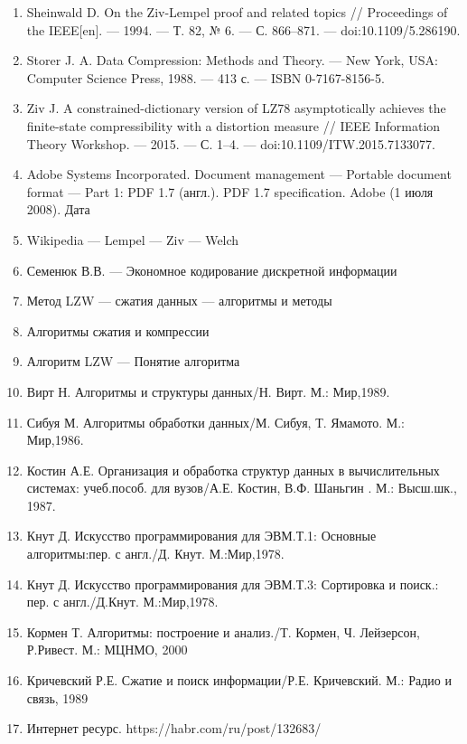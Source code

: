 \documentclass{article}
\begin{document}
\begin{enumerate}
\item Sheinwald D. On the Ziv-Lempel proof and related topics // Proceedings of the IEEE[en]. — 1994. — Т. 82, № 6. — С. 866–871. — doi:10.1109/5.286190.
\item Storer J. A. Data Compression: Methods and Theory. — New York, USA: Computer Science Press, 1988. — 413 с. — ISBN 0-7167-8156-5.
\item Ziv J. A constrained-dictionary version of LZ78 asymptotically achieves the finite-state compressibility with a distortion measure // IEEE Information Theory Workshop. — 2015. — С. 1–4. — doi:10.1109/ITW.2015.7133077.
\item Adobe Systems Incorporated. Document management — Portable document format — Part 1: PDF 1.7 (англ.). PDF 1.7 specification. Adobe (1 июля 2008). Дата
\item Wikipedia — Lempel — Ziv — Welch
\item Семенюк В.В. — Экономное кодирование дискретной информации
\item Метод LZW — сжатия данных — алгоритмы и методы
\item Алгоритмы сжатия и компрессии
\item Алгоритм LZW — Понятие алгоритма
\item Вирт Н. Алгоритмы и структуры данных/Н. Вирт. М.: Мир,1989.
\item Сибуя М. Алгоритмы обработки данных/М. Сибуя, Т. Ямамото. М.: Мир,1986.
\item Костин А.Е. Организация и обработка структур данных в вычислительных системах: учеб.пособ. для вузов/А.Е. Костин, В.Ф. Шаньгин . М.: Высш.шк., 1987.
\item Кнут Д. Искусство программирования для ЭВМ.Т.1: Основные алгоритмы:пер. с англ./Д. Кнут. М.:Мир,1978.
\item Кнут Д. Искусство программирования для ЭВМ.Т.3: Сортировка и поиск.: пер. с англ./Д.Кнут. М.:Мир,1978.
\item Кормен Т. Алгоритмы: построение и анализ./Т. Кормен, Ч. Лейзерсон, Р.Ривест. М.: МЦНМО, 2000
\item Кричевский Р.Е. Сжатие и поиск информации/Р.Е. Кричевский. М.: Радио и связь, 1989
\item Интернет ресурс. https://habr.com/ru/post/132683/
\end{enumerate}
\end{document}
